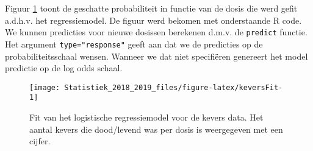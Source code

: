 \documentclass[12pt,dutch,coursenotes]{book}
\newenvironment{Shaded}{\begin{snugshade}}{\end{snugshade}}
\newcommand{\KeywordTok}[1]{\textcolor[rgb]{0.13,0.29,0.53}{\textbf{#1}}}
\newcommand{\DataTypeTok}[1]{\textcolor[rgb]{0.13,0.29,0.53}{#1}}
\newcommand{\DecValTok}[1]{\textcolor[rgb]{0.00,0.00,0.81}{#1}}
\newcommand{\FloatTok}[1]{\textcolor[rgb]{0.00,0.00,0.81}{#1}}
\newcommand{\StringTok}[1]{\textcolor[rgb]{0.31,0.60,0.02}{#1}}
\newcommand{\CommentTok}[1]{\textcolor[rgb]{0.56,0.35,0.01}{\textit{#1}}}
\newcommand{\OperatorTok}[1]{\textcolor[rgb]{0.81,0.36,0.00}{\textbf{#1}}}
\newcommand{\NormalTok}[1]{#1}
\theoremstyle{definition}
\theoremstyle{definition}
\theoremstyle{definition}
\theoremstyle{remark}
\begin{document}
Figuur \ref{fig:keversFit} toont de geschatte probabiliteit in functie
van de dosis die werd gefit a.d.h.v. het regressiemodel. De figuur werd
bekomen met onderstaande R code. We kunnen predicties voor nieuwe
dosissen berekenen d.m.v. de \texttt{predict} functie. Het argument
\texttt{type="response"} geeft aan dat we de predicties op de
probabiliteitsschaal wensen. Wanneer we dat niet specifiëren genereert
het model predictie op de log odds schaal.

\begin{Shaded}
\end{Shaded}

\begin{figure}

{\centering \texttt{[image: Statistiek\_2018\_2019\_files/figure-latex/keversFit-1]} 

}

\caption{Fit van het logistische regressiemodel voor de kevers data. Het aantal kevers die dood/levend was per dosis is weergegeven met een cijfer.}\label{fig:keversFit}
\end{figure}
\end{document}
